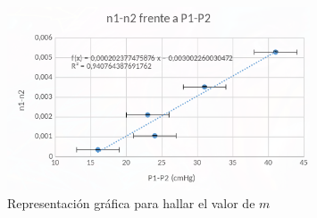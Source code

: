 \documentclass[11pt,letterpaper,twocolumn]{article}
\begin{document}
\begin{figure}[H]
    \centering
    \includegraphics[width=0.8\textwidth]{img/graficap2.png}
    \caption{Representación gráfica para hallar el valor de $m$ }
    \label{fig:img-graficap2-png}
\end{figure}

\onecolumn
\end{document}
